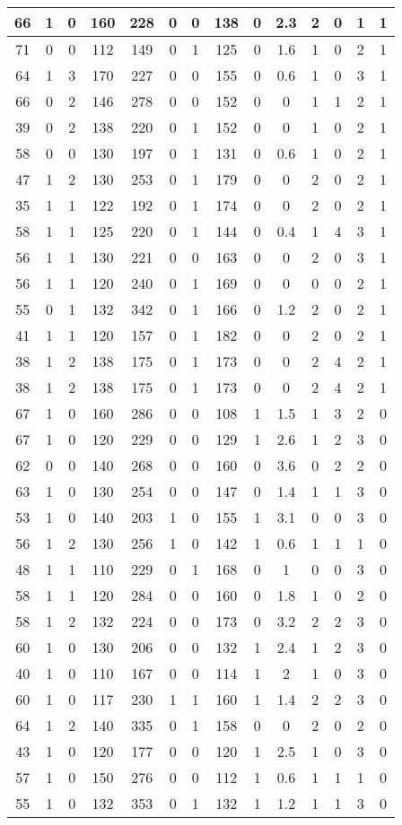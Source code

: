 \documentclass{article}
\begin{document}
\begin{tabular}{
|c|c|c|c|c|c|c|c|c|c|c|c|c|c|}
\hline
66&1&0&160&228&0&0&138&0&2.3&2&0&1&1 \\
\hline
71&0&0&112&149&0&1&125&0&1.6&1&0&2&1 \\
\hline
64&1&3&170&227&0&0&155&0&0.6&1&0&3&1 \\
\hline
66&0&2&146&278&0&0&152&0&0&1&1&2&1 \\
\hline
39&0&2&138&220&0&1&152&0&0&1&0&2&1 \\
\hline
58&0&0&130&197&0&1&131&0&0.6&1&0&2&1 \\
\hline
47&1&2&130&253&0&1&179&0&0&2&0&2&1 \\
\hline
35&1&1&122&192&0&1&174&0&0&2&0&2&1 \\
\hline
58&1&1&125&220&0&1&144&0&0.4&1&4&3&1 \\
\hline
56&1&1&130&221&0&0&163&0&0&2&0&3&1 \\
\hline
56&1&1&120&240&0&1&169&0&0&0&0&2&1 \\
\hline
55&0&1&132&342&0&1&166&0&1.2&2&0&2&1 \\
\hline
41&1&1&120&157&0&1&182&0&0&2&0&2&1 \\
\hline
38&1&2&138&175&0&1&173&0&0&2&4&2&1 \\
\hline
38&1&2&138&175&0&1&173&0&0&2&4&2&1 \\
\hline
67&1&0&160&286&0&0&108&1&1.5&1&3&2&0 \\
\hline
67&1&0&120&229&0&0&129&1&2.6&1&2&3&0 \\
\hline
62&0&0&140&268&0&0&160&0&3.6&0&2&2&0 \\
\hline
63&1&0&130&254&0&0&147&0&1.4&1&1&3&0 \\
\hline
53&1&0&140&203&1&0&155&1&3.1&0&0&3&0 \\
\hline
56&1&2&130&256&1&0&142&1&0.6&1&1&1&0 \\
\hline
48&1&1&110&229&0&1&168&0&1&0&0&3&0 \\
\hline
58&1&1&120&284&0&0&160&0&1.8&1&0&2&0 \\
\hline
58&1&2&132&224&0&0&173&0&3.2&2&2&3&0 \\
\hline
60&1&0&130&206&0&0&132&1&2.4&1&2&3&0 \\
\hline
40&1&0&110&167&0&0&114&1&2&1&0&3&0 \\
\hline
60&1&0&117&230&1&1&160&1&1.4&2&2&3&0 \\
\hline
64&1&2&140&335&0&1&158&0&0&2&0&2&0 \\
\hline
43&1&0&120&177&0&0&120&1&2.5&1&0&3&0 \\
\hline
57&1&0&150&276&0&0&112&1&0.6&1&1&1&0 \\
\hline
55&1&0&132&353&0&1&132&1&1.2&1&1&3&0 \\

\end{tabular}
\end{document}
